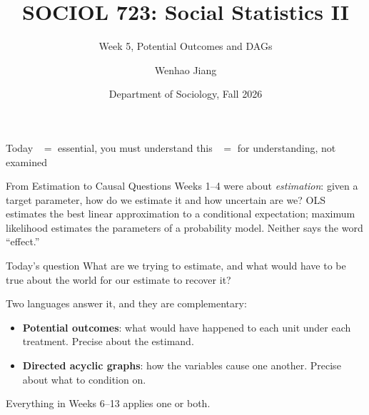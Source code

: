 \documentclass[aspectratio=169,11pt,xcolor=dvipsnames]{beamer}
\title[SOCIOL 723]{SOCIOL 723: Social Statistics II\\[-2pt]}
\subtitle{Week 5, Potential Outcomes and DAGs\\[-6pt]}
\author[Jiang]{Wenhao Jiang\vspace{-2.5em}}
\institute[Duke]{}
\date{Department of Sociology, Fall 2026}
\newcommand{\adv}{\,\raisebox{0.6pt}{\textcolor{accent}{$\bigstar$}}}
\newcommand{\core}{\,\raisebox{0.6pt}{\textcolor{corestar}{$\bigstar$}}}
\begin{document}

\begin{frame}[plain]
  \titlepage
\end{frame}

\begin{frame}{Today}
  \tableofcontents
  \vskip6pt
  {\footnotesize \core{} $=$ essential, you must understand this \quad\quad \adv{} $=$ for understanding, not examined}
\end{frame}

\begin{frame}{From Estimation to Causal Questions}
Weeks 1--4 were about \emph{estimation}: given a target parameter, how do we
estimate it and how uncertain are we? OLS estimates the best linear
approximation to a conditional expectation; maximum likelihood estimates the
parameters of a probability model. Neither says the word ``effect.''
\vskip4pt
\begin{alertblock}{Today's question}
What are we trying to estimate, and what would have to be true about the
world for our estimate to recover it?
\end{alertblock}
\vskip4pt
Two languages answer it, and they are complementary:
\begin{itemize}\itemsep2pt
  \item \textbf{Potential outcomes}: what would have happened to each unit
        under each treatment. Precise about the estimand.
  \item \textbf{Directed acyclic graphs}: how the variables cause one another.
        Precise about what to condition on.
\end{itemize}
Everything in Weeks 6--13 applies one or both.
\end{frame}
\end{document}

